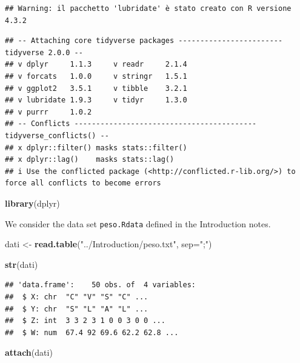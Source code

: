\documentclass[
]{article}
\newenvironment{Shaded}{\begin{snugshade}}{\end{snugshade}}
\newcommand{\AttributeTok}[1]{\textcolor[rgb]{0.13,0.29,0.53}{#1}}
\newcommand{\FunctionTok}[1]{\textcolor[rgb]{0.13,0.29,0.53}{\textbf{#1}}}
\newcommand{\NormalTok}[1]{#1}
\newcommand{\OtherTok}[1]{\textcolor[rgb]{0.56,0.35,0.01}{#1}}
\newcommand{\StringTok}[1]{\textcolor[rgb]{0.31,0.60,0.02}{#1}}
\begin{document}
\begin{verbatim}
## Warning: il pacchetto 'lubridate' è stato creato con R versione 4.3.2
\end{verbatim}

\begin{verbatim}
## -- Attaching core tidyverse packages ------------------------ tidyverse 2.0.0 --
## v dplyr     1.1.3     v readr     2.1.4
## v forcats   1.0.0     v stringr   1.5.1
## v ggplot2   3.5.1     v tibble    3.2.1
## v lubridate 1.9.3     v tidyr     1.3.0
## v purrr     1.0.2     
## -- Conflicts ------------------------------------------ tidyverse_conflicts() --
## x dplyr::filter() masks stats::filter()
## x dplyr::lag()    masks stats::lag()
## i Use the conflicted package (<http://conflicted.r-lib.org/>) to force all conflicts to become errors
\end{verbatim}

\begin{Shaded}
\begin{Highlighting}[]
\FunctionTok{library}\NormalTok{(dplyr)}
\end{Highlighting}
\end{Shaded}

We consider the data set \texttt{peso.Rdata} defined in the Introduction
notes.

\begin{Shaded}
\begin{Highlighting}[]
\NormalTok{dati }\OtherTok{\textless{}{-}} \FunctionTok{read.table}\NormalTok{(}\StringTok{"../Introduction/peso.txt"}\NormalTok{, }\AttributeTok{sep=}\StringTok{";"}\NormalTok{) }
\end{Highlighting}
\end{Shaded}

\begin{Shaded}
\begin{Highlighting}[]
\FunctionTok{str}\NormalTok{(dati)}
\end{Highlighting}
\end{Shaded}

\begin{verbatim}
## 'data.frame':    50 obs. of  4 variables:
##  $ X: chr  "C" "V" "S" "C" ...
##  $ Y: chr  "S" "L" "A" "L" ...
##  $ Z: int  3 3 2 3 1 0 0 3 0 0 ...
##  $ W: num  67.4 92 69.6 62.2 62.8 ...
\end{verbatim}

\begin{Shaded}
\begin{Highlighting}[]
\FunctionTok{attach}\NormalTok{(dati)}
\end{Highlighting}
\end{Shaded}
\end{document}
